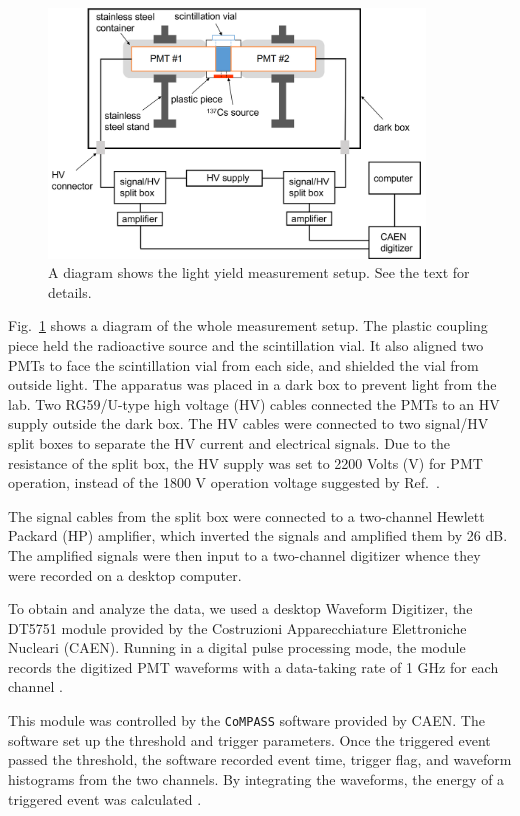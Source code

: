 \begin{figure}[htbp]
	\centering	
	\includegraphics[width=10cm]{teLSsetup.png}
	\caption[A diagram shows the light yield measurement setup.]{A diagram shows the light yield measurement setup. See the text for details.}
	\label{teLSsetup}
\end{figure}

Fig.~\ref{teLSsetup} shows a diagram of the whole measurement setup. The plastic coupling piece held the radioactive source and the scintillation vial. It also aligned two PMTs to face the scintillation vial from each side, and shielded the vial from outside light. The apparatus was placed in a dark box to prevent light from the lab. Two RG59/U-type high voltage (HV) cables connected the PMTs to an HV supply outside the dark box. The HV cables were connected to two signal/HV split boxes to separate the HV current and electrical signals. Due to the resistance of the split box, the HV supply was set to 2200 Volts (V) for PMT operation, instead of the 1800 V operation voltage suggested by Ref.~\cite{pmtR580}. 

The signal cables from the split box were connected to a two-channel Hewlett Packard (HP) amplifier, which inverted the signals and amplified them by 26 dB. The amplified signals were then input to a two-channel digitizer whence they were recorded on a desktop computer.

To obtain and analyze the data, we used a desktop Waveform Digitizer, the DT5751 module provided by the Costruzioni Apparecchiature Elettroniche Nucleari (CAEN). Running in a digital pulse processing mode, the module records the digitized PMT waveforms with a data-taking rate of 1 GHz for each channel \cite{caen}.

This module was controlled by the \texttt{CoMPASS} software provided by CAEN. The software set up the threshold and trigger parameters. Once the triggered event passed the threshold, the software recorded event time, trigger flag, and waveform histograms from the two channels. By integrating the waveforms, the energy of a triggered event was calculated \cite{compass}.

